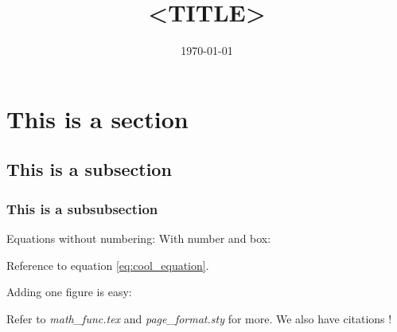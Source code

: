 \documentclass[12pt, a4paper]{article}
\title{<TITLE>} %
\author{\JL} %
\date{\today} %
\begin{document}
\maketitlepage

\section{This is a section}
\subsection{This is a subsection}
\subsubsection{This is a subsubsection}
Equations without numbering:
With number and box:

Reference to equation \eqref{eq:cool_equation}.


Adding one figure is easy:

Refer to \textit{math\_func.tex} and \textit{page\_format.sty} for more. We also have citations \cite{CitekeyBook}!

\newpage
\nocite{*}
\printbibliography

\blankpage

\end{document}

